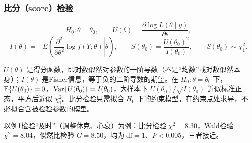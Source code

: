 \subsubsection{比分（score）检验}
\[
H_0:\theta=\theta_0,\qquad
U(\theta)=\frac{\partial\log L(\theta\mid y)}{\partial\theta},
\]
\[
I(\theta)=-E\left(\left.\frac{\partial^2}{\partial\theta^2}\log f(Y;\theta)\right|\theta\right),\qquad
S(\theta_0)=\frac{U(\theta_0)^2}{I(\theta_0)},\qquad S(\theta_0)\sim\chi_1^2.
\]
\begin{annotation}
$U(\theta)$ 是得分函数，即对数似然对参数的一阶导数（不是“均数”或对数似然本身）；$I(\theta)$ 是Fisher信息，等于负的二阶导数的期望。在 $H_0:\theta=\theta_0$ 下，$\operatorname{E}\{U(\theta_0)\}=0$，$\operatorname{Var}\{U(\theta_0)\}=I(\theta_0)$，大样本下 $U(\theta_0)/\sqrt{I(\theta_0)}$ 近似标准正态，平方后近似 $\chi^2_1$。比分检验只需拟合 $H_0$ 下的约束模型，在约束点处求导，不必拟合含被检验参数的模型。
\end{annotation}
以例1检验“及时”（调整休克、心衰）为例：比分检验 $\chi^2=8.30$，Wald检验 $\chi^2=8.04$，似然比检验 $G=8.50$，均为 $\mathrm{df}=1$、$P<0.005$，三者接近。
